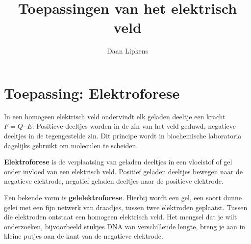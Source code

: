 \documentclass{ximera}
\title{Toepassingen van het elektrisch veld}
\author{Daan Lipkens}
\begin{document}
\begin{abstract}
\end{abstract}
\maketitle


\section{Toepassing: Elektroforese}
   In een homogeen elektrisch veld ondervindt elk geladen deeltje een kracht $F=Q\cdot E$. Positieve deeltjes worden in de zin van het veld geduwd, negatieve deeltjes in de tegengestelde zin. Dit principe wordt in biochemische laboratoria dagelijks gebruikt om moleculen te scheiden. 

   \textbf{Elektroforese} is de verplaatsing van geladen deeltjes in een vloeistof of gel onder invloed van een elektrisch veld. Positief geladen deeltjes bewegen naar de negatieve elektrode, negatief geladen deeltjes naar de positieve elektrode.

    Een bekende vorm is \textbf{gelelektroforese}. Hierbij wordt een gel, een soort dunne gelei met een fijn netwerk van draadjes, tussen twee elektroden geplaatst. Tussen die elektroden ontstaat een homogeen elektrisch veld. Het mengsel dat je wilt onderzoeken, bijvoorbeeld stukjes DNA van verschillende lengte, breng je aan in kleine putjes aan de kant van de negatieve elektrode.

    
\end{document}
